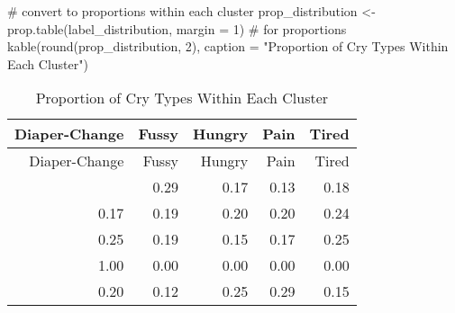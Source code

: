 \documentclass[
  letterpaper,
  DIV=11,
  numbers=noendperiod]{scrartcl}
\newenvironment{Shaded}{\begin{snugshade}}{\end{snugshade}}
\newcommand{\AttributeTok}[1]{\textcolor[rgb]{0.40,0.45,0.13}{#1}}
\newcommand{\CommentTok}[1]{\textcolor[rgb]{0.37,0.37,0.37}{#1}}
\newcommand{\DecValTok}[1]{\textcolor[rgb]{0.68,0.00,0.00}{#1}}
\newcommand{\FunctionTok}[1]{\textcolor[rgb]{0.28,0.35,0.67}{#1}}
\newcommand{\NormalTok}[1]{\textcolor[rgb]{0.00,0.23,0.31}{#1}}
\newcommand{\OtherTok}[1]{\textcolor[rgb]{0.00,0.23,0.31}{#1}}
\newcommand{\StringTok}[1]{\textcolor[rgb]{0.13,0.47,0.30}{#1}}
\begin{document}
\begin{Shaded}
\begin{Highlighting}[]
\CommentTok{\# convert to proportions within each cluster}
\NormalTok{prop\_distribution }\OtherTok{\textless{}{-}} \FunctionTok{prop.table}\NormalTok{(label\_distribution, }\AttributeTok{margin =} \DecValTok{1}\NormalTok{) }
\CommentTok{\# for proportions}
\FunctionTok{kable}\NormalTok{(}\FunctionTok{round}\NormalTok{(prop\_distribution, }\DecValTok{2}\NormalTok{), }\AttributeTok{caption =} \StringTok{"Proportion of Cry Types Within Each Cluster"}\NormalTok{)}
\end{Highlighting}
\end{Shaded}

\begin{longtable}[]{@{}rrrrr@{}}
\caption{Proportion of Cry Types Within Each Cluster}\tabularnewline
\toprule\noalign{}
Diaper-Change & Fussy & Hungry & Pain & Tired \\
\midrule\noalign{}
\endfirsthead
\toprule\noalign{}
Diaper-Change & Fussy & Hungry & Pain & Tired \\
\midrule\noalign{}
\endhead
\bottomrule\noalign{}
\endlastfoot
0.23 & 0.29 & 0.17 & 0.13 & 0.18 \\
0.17 & 0.19 & 0.20 & 0.20 & 0.24 \\
0.25 & 0.19 & 0.15 & 0.17 & 0.25 \\
1.00 & 0.00 & 0.00 & 0.00 & 0.00 \\
0.20 & 0.12 & 0.25 & 0.29 & 0.15 \\
\end{longtable}
\end{document}
